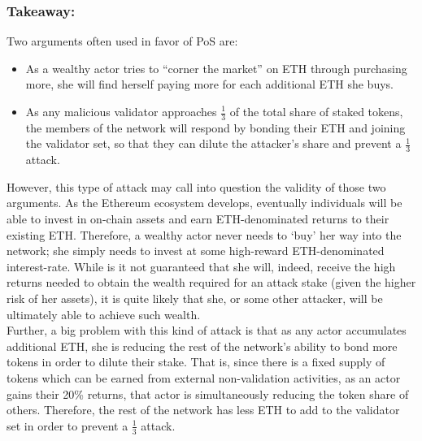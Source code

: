 \documentclass{article}
\renewcommand{\|}{\;|\;}
\begin{document}
\subsubsection*{Takeaway:}

Two arguments often used in favor of PoS are:
\begin{itemize}
    \item As a wealthy actor tries to “corner the market” on ETH through purchasing more, she will find herself paying more for each additional ETH she buys. 
    \item As any malicious validator approaches $\frac{1}{3}$ of the total share of staked tokens, the members of the network will respond by bonding their ETH and joining the validator set, so that they can dilute the attacker’s share and prevent a $\frac{1}{3}$ attack.
\end{itemize}
However, this type of attack may call into question the validity of those two arguments. As the Ethereum ecosystem develops, eventually individuals will be able to invest in on-chain assets and earn ETH-denominated returns to their existing ETH. Therefore, a wealthy actor never needs to ‘buy’ her way into the network; she simply needs to invest at some high-reward ETH-denominated interest-rate. While is it not guaranteed that she will, indeed, receive the high returns needed to obtain the wealth required for an attack stake (given the higher risk of her assets), it is quite likely that she, or some other attacker, will be ultimately able to achieve such wealth. \\ 

Further, a big problem with this kind of attack is that as any actor accumulates additional ETH, she is reducing the rest of the network’s ability to bond more tokens in order to dilute their stake. That is, since there is a fixed supply of tokens which can be earned from external non-validation activities, as an actor gains their 20\% returns, that actor is simultaneously reducing the token share of others. Therefore, the rest of the network has less ETH to add to the validator set in order to prevent a $\frac{1}{3}$ attack.
\end{document}
